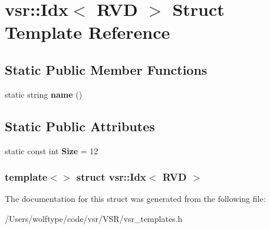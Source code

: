 \hypertarget{structvsr_1_1_idx_3_01_r_v_d_01_4}{\section{vsr\-:\-:Idx$<$ R\-V\-D $>$ Struct Template Reference}
\label{structvsr_1_1_idx_3_01_r_v_d_01_4}
}
\subsection*{Static Public Member Functions}
\begin{DoxyCompactItemize}
\item 
\hypertarget{structvsr_1_1_idx_3_01_r_v_d_01_4_ab504b6f2e57c12c80b4f9aeec449f806}{static string {\bfseries name} ()}\label{structvsr_1_1_idx_3_01_r_v_d_01_4_ab504b6f2e57c12c80b4f9aeec449f806}

\end{DoxyCompactItemize}
\subsection*{Static Public Attributes}
\begin{DoxyCompactItemize}
\item 
\hypertarget{structvsr_1_1_idx_3_01_r_v_d_01_4_af0d586d4543b59c5549cfd20812bc1f6}{static const int {\bfseries Size} = 12}\label{structvsr_1_1_idx_3_01_r_v_d_01_4_af0d586d4543b59c5549cfd20812bc1f6}

\end{DoxyCompactItemize}
\subsubsection*{template$<$$>$ struct vsr\-::\-Idx$<$ R\-V\-D $>$}



The documentation for this struct was generated from the following file\-:\begin{DoxyCompactItemize}
\item 
/\-Users/wolftype/code/vsr/\-V\-S\-R/vsr\-\_\-templates.\-h\end{DoxyCompactItemize}
